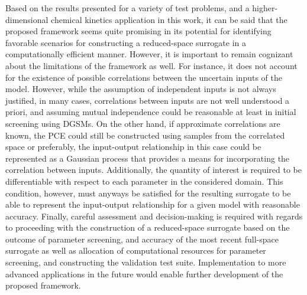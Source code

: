 Based on the results presented for a variety of test problems, and a
higher-dimensional chemical kinetics application in this work, it can be said
that the proposed framework seems quite promising in its potential for
identifying favorable scenarios for constructing a reduced-space surrogate in a
computationally efficient manner.  However, it is important to remain cognizant
about the limitations of the framework as well. For instance, it does not
account for the existence of possible correlations between the uncertain
inputs of the model. However, while the assumption of independent
inputs is not always justified, in many cases, correlations between
inputs are not well understood a priori, and assuming mutual independence
could be reasonable at least in initial screening using DGSMs. On the other
hand, if approximate correlations are known, the PCE could still be 
constructed using samples from the correlated space or preferably,
the input-output relationship in this case could be represented as a Gaussian process
that provides a means for incorporating the correlation between inputs.  
Additionally, the quantity of interest is required to be differentiable with
respect to each parameter in the considered domain. This condition, however,
must anyways be satisfied for the resulting surrogate to be able to represent
the input-output relationship for a given model with reasonable accuracy.
Finally, careful assessment and decision-making is required with regards to
proceeding with the construction of a reduced-space surrogate based on the
outcome of parameter screening, and accuracy of the most recent full-space
surrogate as well as allocation of computational resources for parameter
screening, and constructing the validation test suite. Implementation to more
advanced applications in the future would enable further development of the
proposed framework. 

















